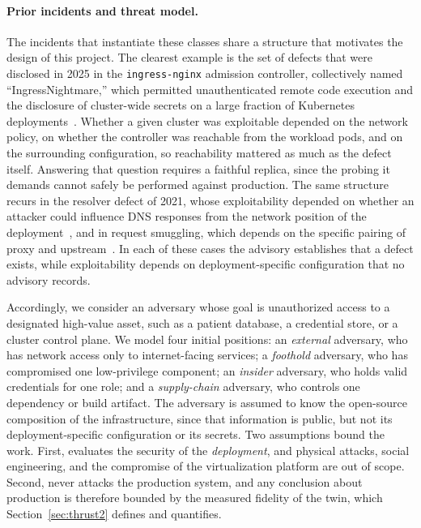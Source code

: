 \paragraph{Prior incidents and threat model.}
The incidents that instantiate these classes share a structure that motivates
the design of this project.
The clearest example is the set of defects that were disclosed in 2025 in the
\texttt{ingress-nginx} admission controller, collectively named
``IngressNightmare,'' which permitted unauthenticated remote code execution
and the disclosure of cluster-wide secrets on a large fraction of Kubernetes
deployments~\cite{ingressnightmare}. Whether a given cluster was exploitable depended on the network policy, on
whether the controller was reachable from the workload pods, and on the
surrounding configuration, so reachability mattered as much as the defect
itself. Answering that question requires a faithful replica, since the probing
it demands cannot safely be performed against production. The same structure recurs in the resolver defect of 2021, whose
exploitability depended on whether an attacker could influence DNS responses
from the network position of the deployment~\cite{cve2021:resolver}, and in
request smuggling, which depends on the specific pairing of proxy and
upstream~\cite{cve2019:smuggling,orangetsai}. In each of these cases the advisory establishes that a defect exists, while
exploitability depends on deployment-specific configuration that no advisory
records.

Accordingly, we consider an adversary whose goal is unauthorized access to a
designated high-value asset, such as a patient database, a credential store,
or a cluster control plane. We model four initial positions: an
\emph{external} adversary, who has network access only to internet-facing
services; a \emph{foothold} adversary, who has compromised one low-privilege
component; an \emph{insider} adversary, who holds valid credentials for one
role; and a \emph{supply-chain} adversary, who controls one dependency or
build artifact. The adversary is assumed to know the open-source composition
of the infrastructure, since that information is public, but not its
deployment-specific configuration or its secrets. Two assumptions bound the
work. First, \sysname evaluates the security of the \emph{deployment}, and physical
attacks, social engineering, and the compromise of the virtualization
platform are out of scope. Second, \sysname never attacks the production
system, and any conclusion about production is therefore bounded by the measured fidelity of the twin, which
Section~\ref{sec:thrust2} defines and quantifies.
